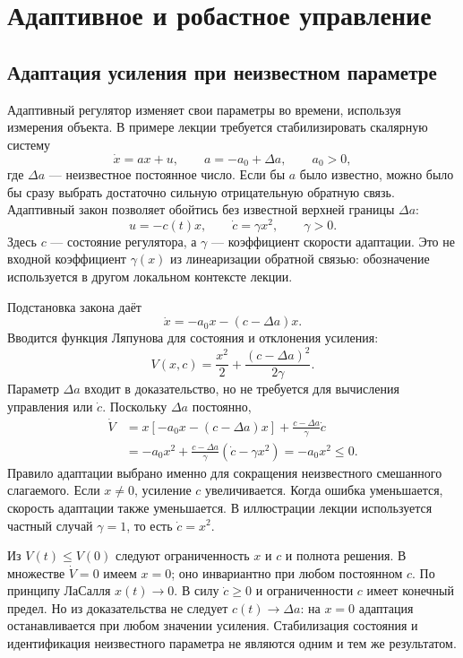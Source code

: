 \section{Адаптивное и робастное управление}
\label{sec:adaptive}

\subsection{Адаптация усиления при неизвестном параметре}

Адаптивный регулятор изменяет свои параметры во времени, используя измерения
объекта. В примере лекции требуется стабилизировать скалярную систему
\[
 \dot x=ax+u,\qquad a=-a_0+\Delta a,\qquad a_0>0,
\]
где $\Delta a$ --- неизвестное постоянное число. Если бы $a$ было известно,
можно было бы сразу выбрать достаточно сильную отрицательную обратную связь.
Адаптивный закон позволяет обойтись без известной верхней границы $\Delta a$:
\begin{equation}
 u=-c(t)x,\qquad \dot c=\gamma x^2,\qquad \gamma>0.
 \label{eq:adaptive-law}
\end{equation}
Здесь $c$ --- состояние регулятора, а $\gamma$ --- коэффициент скорости
адаптации. Это не входной коэффициент $\gamma(x)$ из линеаризации обратной
связью: обозначение используется в другом локальном контексте лекции.

Подстановка закона даёт
\[
 \dot x=-a_0x-(c-\Delta a)x.
\]
Вводится функция Ляпунова для состояния и отклонения усиления:
\[
 V(x,c)=\frac{x^2}{2}+\frac{(c-\Delta a)^2}{2\gamma}.
\]
Параметр $\Delta a$ входит в доказательство, но не требуется для вычисления
управления или $\dot c$. Поскольку $\Delta a$ постоянно,
\begin{align*}
 \dot V&=x[-a_0x-(c-\Delta a)x]
       +\frac{c-\Delta a}{\gamma}\dot c\\
 &=-a_0x^2+\frac{c-\Delta a}{\gamma}(\dot c-\gamma x^2)
 =-a_0x^2\le0.
\end{align*}
Правило адаптации выбрано именно для сокращения неизвестного смешанного
слагаемого. Если $x\ne0$, усиление $c$ увеличивается. Когда ошибка уменьшается,
скорость адаптации также уменьшается. В иллюстрации лекции используется
частный случай $\gamma=1$, то есть $\dot c=x^2$.

\addition Из $V(t)\le V(0)$ следуют ограниченность $x$ и $c$ и полнота
решения. В множестве $\dot V=0$ имеем $x=0$; оно инвариантно при любом
постоянном $c$. По принципу ЛаСалля $x(t)\to0$. В силу $\dot c\ge0$ и
ограниченности $c$ имеет конечный предел. Но из доказательства не следует
$c(t)\to\Delta a$: на $x=0$ адаптация останавливается при любом значении
усиления. Стабилизация состояния и идентификация неизвестного параметра
не являются одним и тем же результатом.

